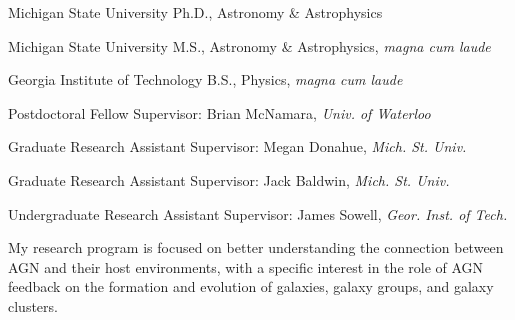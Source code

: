 \documentclass[11pt]{cv}
\begin{document}
\begin{llist}


Michigan State University
Ph.D., Astronomy \& Astrophysics

Michigan State University
M.S., Astronomy \& Astrophysics, \textit{magna cum laude}

Georgia Institute of Technology
B.S., Physics, \textit{magna cum laude}



Postdoctoral Fellow
Supervisor: Brian McNamara, {\textit{Univ. of Waterloo}}

Graduate Research Assistant
Supervisor: Megan Donahue, {\textit{Mich. St. Univ.}}

Graduate Research Assistant
Supervisor: Jack Baldwin, {\textit{Mich. St. Univ.}}

Undergraduate Research Assistant
Supervisor: James Sowell, {\textit{Geor. Inst. of Tech.}}



My research program is focused on better understanding the connection
between AGN and their host environments, with a specific interest in
the role of AGN feedback on the formation and evolution of galaxies,
galaxy groups, and galaxy clusters.


\end{llist}
\end{document}
